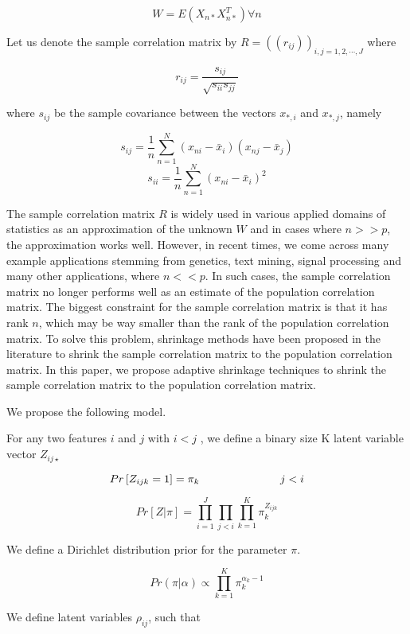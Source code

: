 \documentclass[12pt]{article}
\begin{document}
\begin{equation}
W = E \left (X_{n *}  X_{n *}^{T} \right)  \forall n
\end{equation}

Let us denote the sample correlation matrix by $R = ((r_{ij}))_{i, j = 1,2, \cdots, J} $ where

$$ r_{ij} = \frac{s_{ij}}{\sqrt{s_{ii} s_{jj}}} $$

where $s_{ij}$ be the sample covariance between the vectors $x_{*,i}$ and $x_{*,j}$, namely

$$  s_{ij} = \frac{1}{n} \sum_{n=1}^{N} \left ( x_{ni} - \bar{x}_{i} \right ) \left ( x_{nj} - \bar{x}_{j} \right ) $$
$$  s_{ii} = \frac{1}{n} \sum_{n=1}^{N} \left ( x_{ni} - \bar{x}_{i} \right )^2 $$

The sample correlation matrix $R$ is widely used in various applied domains of statistics as an approximation of the unknown $W$ and in cases where $ n >> p $, the approximation works well. However, in recent times, we come across many example applications stemming from genetics, text mining, signal processing and many other applications, where $ n << p$. In  such cases, the sample correlation matrix no longer performs well as an estimate of the population correlation matrix. The biggest constraint for the sample correlation matrix is that it has rank $n$, which may be way smaller than the rank of the population correlation matrix. To solve this problem, shrinkage methods have been proposed in the literature to shrink the sample correlation matrix to the population correlation matrix. In this paper, we propose adaptive shrinkage techniques to shrink the sample correlation matrix to the population correlation matrix. 

We propose the following model.

For any two features $i$ and $j$ with $ i < j$ , we define a binary size K latent variable vector $Z_{ij \star}$ 

$$  Pr \left [ Z_{ijk} = 1  \right ] = \pi_{k}    \hspace{1 in}  j < i $$

$$ Pr \left [ Z | \pi \right ] = \prod_{i=1}^{J} \prod_{j < i} \prod_{k=1}^{K} \pi_{k}^{Z_{ijk}}  $$

We define a Dirichlet distribution prior for the parameter $\pi$. 

$$ Pr \left ( \pi | \alpha \right )   \propto \prod_{k=1}^{K} \pi_{k}^{\alpha_{k} - 1}  $$

We define  latent variables $\rho_{ij}$, such that
\end{document}
